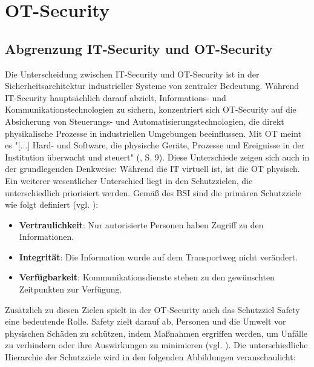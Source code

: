 \section{OT-Security}

\subsection{Abgrenzung IT-Security und OT-Security}

Die Unterscheidung zwischen IT-Security und OT-Security ist in der Sicherheitsarchitektur industrieller Systeme von zentraler Bedeutung. Während IT-Security hauptsächlich darauf abzielt, Informations- und Kommunikationstechnologien zu sichern, konzentriert sich OT-Security auf die Absicherung von Steuerungs- und Automatisierungstechnologien, die direkt physikalische Prozesse in industriellen Umgebungen beeinflussen. Mit OT meint es "[...] Hard- und Software, die physische Geräte, Prozesse und Ereignisse in der Institution überwacht und steuert" (\cite {ICS}, S. 9). Diese Unterschiede zeigen sich auch in der grundlegenden Denkweise: Während die IT virtuell ist, ist die OT physisch. Ein weiterer wesentlicher Unterschied liegt in den Schutzzielen, die unterschiedlich priorisiert werden. Gemäß des BSI sind die primären Schutzziele wie folgt definiert (vgl. \cite{BSI}): 
\begin{itemize}
\item \textbf{Vertraulichkeit}: Nur autorisierte Personen haben Zugriff zu den Informationen.
\item \textbf{Integrität}: Die Information wurde auf dem Transportweg nicht verändert.
\item \textbf{Verfügbarkeit}: Kommunikationsdienste stehen zu den gewünschten Zeitpunkten zur Verfügung.
\end{itemize}
Zusätzlich zu diesen Zielen spielt in der OT-Security auch das Schutzziel Safety eine bedeutende Rolle. Safety zielt darauf ab, Personen und die Umwelt vor physischen Schäden zu schützen, indem Maßnahmen ergriffen werden, um Unfälle zu verhindern oder ihre Auswirkungen zu minimieren (vgl. \cite{Safety}). Die unterschiedliche Hierarchie der Schutzziele wird in den folgenden Abbildungen veranschaulicht:
